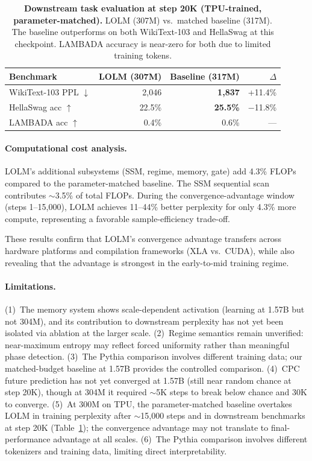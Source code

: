 \documentclass{article}
\begin{document}
\begin{table}[t]
\centering
\caption{\textbf{Downstream task evaluation at step 20K (TPU-trained,
parameter-matched).} LOLM (307M) vs.\ matched baseline (317M). The
baseline outperforms on both WikiText-103 and HellaSwag at this checkpoint.
LAMBADA accuracy is near-zero for both due to limited training tokens.}
\label{tab:downstream}
\vspace{0.5em}
\begin{tabular}{lrrr}
\toprule
\textbf{Benchmark} & \textbf{LOLM (307M)} & \textbf{Baseline (317M)} & \textbf{$\Delta$} \\
\midrule
WikiText-103 PPL $\downarrow$ & 2{,}046 & \textbf{1{,}837} & +11.4\% \\
HellaSwag acc $\uparrow$ & 22.5\% & \textbf{25.5\%} & $-$11.8\% \\
LAMBADA acc $\uparrow$ & 0.4\% & 0.6\% & --- \\
\bottomrule
\end{tabular}
\end{table}

\paragraph{Computational cost analysis.}
LOLM's additional subsystems (SSM, regime, memory, gate) add 4.3\% FLOPs
compared to the parameter-matched baseline. The SSM sequential scan contributes
${\sim}$3.5\% of total FLOPs. During the convergence-advantage window (steps
1--15{,}000), LOLM achieves 11--44\% better perplexity for only 4.3\% more
compute, representing a favorable sample-efficiency trade-off.

These results confirm that LOLM's convergence advantage transfers across
hardware platforms and compilation frameworks (XLA vs.\ CUDA), while also
revealing that the advantage is strongest in the early-to-mid training regime.

\paragraph{Limitations.}
(1)~The memory system shows scale-dependent activation (learning at 1.57B but
not 304M), and its contribution to downstream perplexity has not yet been
isolated via ablation at the larger scale. (2)~Regime semantics remain
unverified: near-maximum entropy may reflect forced uniformity rather than
meaningful phase detection. (3)~The Pythia comparison involves different
training data; our matched-budget baseline at 1.57B provides the controlled
comparison. (4)~CPC future prediction has not yet converged at 1.57B (still
near random chance at step 20K), though at 304M it required ${\sim}$5K steps to
break below chance and 30K to converge. (5)~At 300M on TPU, the parameter-matched
baseline overtakes LOLM in training perplexity after ${\sim}$15{,}000 steps and
in downstream benchmarks at step 20K (Table~\ref{tab:downstream}); the
convergence advantage may not translate to final-performance advantage at all
scales. (6)~The Pythia comparison involves different tokenizers and training
data, limiting direct interpretability.
\end{document}
